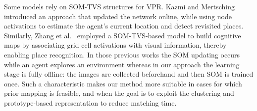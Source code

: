 \documentclass[letterpaper, 10 pt, conference]{ieeeconf}  %
\begin{document}



Some models rely on \ac{SOM-TVS} structures for \ac{VPR}. Kazmi and Mertsching~\cite{gsom_vpr} introduced an approach that  updated the network online, while using node activations to estimate the agent’s current location and detect revisited places. Similarly, Zhang et al.~\cite{gsomapp1} employed a \ac{SOM-TVS}-based model to build cognitive maps by associating grid cell activations with visual information, thereby enabling place recognition. In those previous works the SOM updating occurs while an agent explores an environment whereas in our approach the learning stage is fully offline: the images are collected beforehand and then SOM is trained once. Such a characteristic makes our method more suitable in cases for which prior mapping is feasible, and when the goal is to exploit the clustering and prototype-based representation to reduce matching time.




\end{document}
